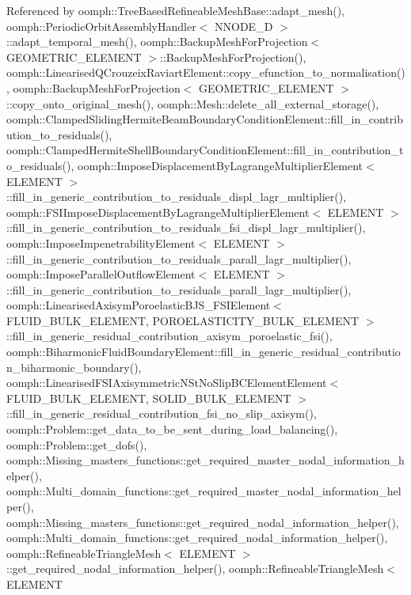 Referenced by oomph\+::\+Tree\+Based\+Refineable\+Mesh\+Base\+::adapt\+\_\+mesh(), oomph\+::\+Periodic\+Orbit\+Assembly\+Handler$<$ N\+N\+O\+D\+E\+\_\+D $>$\+::adapt\+\_\+temporal\+\_\+mesh(), oomph\+::\+Backup\+Mesh\+For\+Projection$<$ G\+E\+O\+M\+E\+T\+R\+I\+C\+\_\+\+E\+L\+E\+M\+E\+N\+T $>$\+::\+Backup\+Mesh\+For\+Projection(), oomph\+::\+Linearised\+Q\+Crouzeix\+Raviart\+Element\+::copy\+\_\+efunction\+\_\+to\+\_\+normalisation(), oomph\+::\+Backup\+Mesh\+For\+Projection$<$ G\+E\+O\+M\+E\+T\+R\+I\+C\+\_\+\+E\+L\+E\+M\+E\+N\+T $>$\+::copy\+\_\+onto\+\_\+original\+\_\+mesh(), oomph\+::\+Mesh\+::delete\+\_\+all\+\_\+external\+\_\+storage(), oomph\+::\+Clamped\+Sliding\+Hermite\+Beam\+Boundary\+Condition\+Element\+::fill\+\_\+in\+\_\+contribution\+\_\+to\+\_\+residuals(), oomph\+::\+Clamped\+Hermite\+Shell\+Boundary\+Condition\+Element\+::fill\+\_\+in\+\_\+contribution\+\_\+to\+\_\+residuals(), oomph\+::\+Impose\+Displacement\+By\+Lagrange\+Multiplier\+Element$<$ E\+L\+E\+M\+E\+N\+T $>$\+::fill\+\_\+in\+\_\+generic\+\_\+contribution\+\_\+to\+\_\+residuals\+\_\+displ\+\_\+lagr\+\_\+multiplier(), oomph\+::\+F\+S\+I\+Impose\+Displacement\+By\+Lagrange\+Multiplier\+Element$<$ E\+L\+E\+M\+E\+N\+T $>$\+::fill\+\_\+in\+\_\+generic\+\_\+contribution\+\_\+to\+\_\+residuals\+\_\+fsi\+\_\+displ\+\_\+lagr\+\_\+multiplier(), oomph\+::\+Impose\+Impenetrability\+Element$<$ E\+L\+E\+M\+E\+N\+T $>$\+::fill\+\_\+in\+\_\+generic\+\_\+contribution\+\_\+to\+\_\+residuals\+\_\+parall\+\_\+lagr\+\_\+multiplier(), oomph\+::\+Impose\+Parallel\+Outflow\+Element$<$ E\+L\+E\+M\+E\+N\+T $>$\+::fill\+\_\+in\+\_\+generic\+\_\+contribution\+\_\+to\+\_\+residuals\+\_\+parall\+\_\+lagr\+\_\+multiplier(), oomph\+::\+Linearised\+Axisym\+Poroelastic\+B\+J\+S\+\_\+\+F\+S\+I\+Element$<$ F\+L\+U\+I\+D\+\_\+\+B\+U\+L\+K\+\_\+\+E\+L\+E\+M\+E\+N\+T, P\+O\+R\+O\+E\+L\+A\+S\+T\+I\+C\+I\+T\+Y\+\_\+\+B\+U\+L\+K\+\_\+\+E\+L\+E\+M\+E\+N\+T $>$\+::fill\+\_\+in\+\_\+generic\+\_\+residual\+\_\+contribution\+\_\+axisym\+\_\+poroelastic\+\_\+fsi(), oomph\+::\+Biharmonic\+Fluid\+Boundary\+Element\+::fill\+\_\+in\+\_\+generic\+\_\+residual\+\_\+contribution\+\_\+biharmonic\+\_\+boundary(), oomph\+::\+Linearised\+F\+S\+I\+Axisymmetric\+N\+St\+No\+Slip\+B\+C\+Element\+Element$<$ F\+L\+U\+I\+D\+\_\+\+B\+U\+L\+K\+\_\+\+E\+L\+E\+M\+E\+N\+T, S\+O\+L\+I\+D\+\_\+\+B\+U\+L\+K\+\_\+\+E\+L\+E\+M\+E\+N\+T $>$\+::fill\+\_\+in\+\_\+generic\+\_\+residual\+\_\+contribution\+\_\+fsi\+\_\+no\+\_\+slip\+\_\+axisym(), oomph\+::\+Problem\+::get\+\_\+data\+\_\+to\+\_\+be\+\_\+sent\+\_\+during\+\_\+load\+\_\+balancing(), oomph\+::\+Problem\+::get\+\_\+dofs(), oomph\+::\+Missing\+\_\+masters\+\_\+functions\+::get\+\_\+required\+\_\+master\+\_\+nodal\+\_\+information\+\_\+helper(), oomph\+::\+Multi\+\_\+domain\+\_\+functions\+::get\+\_\+required\+\_\+master\+\_\+nodal\+\_\+information\+\_\+helper(), oomph\+::\+Missing\+\_\+masters\+\_\+functions\+::get\+\_\+required\+\_\+nodal\+\_\+information\+\_\+helper(), oomph\+::\+Multi\+\_\+domain\+\_\+functions\+::get\+\_\+required\+\_\+nodal\+\_\+information\+\_\+helper(), oomph\+::\+Refineable\+Triangle\+Mesh$<$ E\+L\+E\+M\+E\+N\+T $>$\+::get\+\_\+required\+\_\+nodal\+\_\+information\+\_\+helper(), oomph\+::\+Refineable\+Triangle\+Mesh$<$ E\+L\+E\+M\+E\+N\+T 